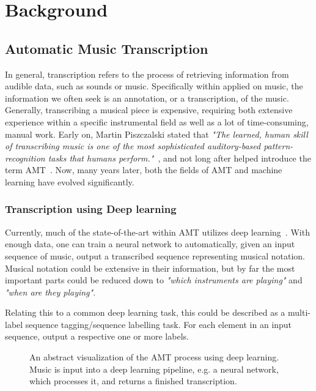 \chapter{Background}\label{Background}

\section{Automatic Music Transcription}

In general, transcription refers to the process of retrieving information from audible data, such as sounds or music. Specifically within applied on music, the information we often seek is an annotation, or a transcription, of the music. Generally, transcribing a musical piece is expensive, requiring both extensive experience within a specific instrumental field as well as a lot of  time-consuming, manual work. Early on, Martin Piszczalski stated that \textit{"The learned, human skill of transcribing music is one of the most sophisticated auditory-based pattern-recognition tasks that humans perform."}~\cite{10.5555/15202}, and not long after helped introduce the term \acrfull{AMT}~\cite{piszczalski1977automatic}. Now, many years later, both the fields of \gls{AMT} and machine learning have evolved significantly.

\subsection{Transcription using Deep learning}
Currently, much of the state-of-the-art within \gls{AMT} utilizes deep learning~\cite{8350302, signals4040042, jamshidi2024machine}. With enough data, one can train a neural network to automatically, given an input sequence of music, output a transcribed sequence representing musical notation. Musical notation could be extensive in their information, but by far the most important parts could be reduced down to \textit{"which instruments are playing"} and \textit{"when are they playing"}.

Relating this to a common deep learning task, this could be described as a multi-label sequence tagging/sequence labelling task. For each element in an input sequence, output a respective one or more labels.

\begin{figure}[H]
    \centering
    
    \caption{An abstract visualization of the \acrfull{AMT} process using deep learning. Music is input into a deep learning pipeline, e.g. a neural network, which processes it, and returns a finished transcription.}
    \label{AMTFigure}
\end{figure}

